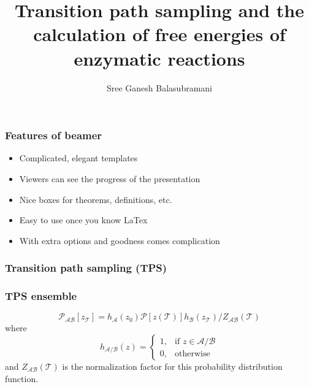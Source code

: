 \documentclass{beamer}
\title[TPS free energies]{Transition path sampling and the calculation of free energies of enzymatic reactions}
\subtitle{}
\author[Schwartz Group]{Sree Ganesh Balasubramani}
\institute[U of A]{Schwartz Group \\ Chemistry and Biochemistry \\ University of Arizona}
\date{}
\begin{document}
\begin{frame}
  \titlepage
\end{frame}
\begin{frame}
  \frametitle{Features of beamer}
\begin{itemize}
\item Complicated, elegant templates
\item Viewers can see the progress of the presentation
\item Nice boxes for theorems, definitions, etc.
\item Easy to use once you know LaTex
\item With extra options and goodness comes complication
\end{itemize}
\end{frame}
\begin{frame}
\frametitle{Transition path sampling (TPS)}
\end{frame}
\begin{frame}
\frametitle{TPS ensemble}
\begin{equation}
\mathcal{P}_{\mathcal{AB}}[z_{\mathcal{T}}] = h_{\mathcal{A}}(z_0)\mathcal{P}[z(\mathcal{T})]
h_{\mathcal{B}}(z_{\mathcal{T}})/Z_{\mathcal{AB}}(\mathcal{T})\label{eqn:tpsensem}
\end{equation}
where 
\[
    h_{\mathcal{A}/\mathcal{B}}(z)= 
\begin{cases}
    1, & \text{if } z\in \mathcal{A}/\mathcal{B}\\
    0,              & \text{otherwise}
\end{cases}
\]
and $Z_{\mathcal{AB}}(\mathcal{T})$ is the normalization factor for this 
probability distribution function.
\end{frame}
\end{document}
